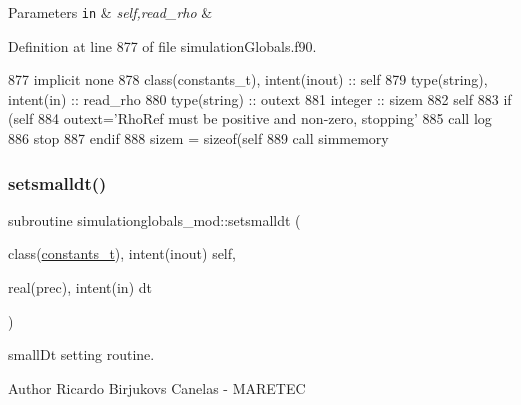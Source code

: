 \begin{DoxyParams}[1]{Parameters}
\mbox{\tt in}  & {\em self,read\+\_\+rho} & \\
\hline
\end{DoxyParams}


Definition at line 877 of file simulation\+Globals.\+f90.


\begin{DoxyCode}
877     \textcolor{keywordtype}{implicit none}
878     \textcolor{keywordtype}{class}(constants\_t), \textcolor{keywordtype}{intent(inout)} :: self
879     \textcolor{keywordtype}{type}(string), \textcolor{keywordtype}{intent(in)} :: read\_rho
880     \textcolor{keywordtype}{type}(string) :: outext
881     \textcolor{keywordtype}{integer} :: sizem
882     self%
883     \textcolor{keywordflow}{if} (self%
884         outext=\textcolor{stringliteral}{'RhoRef must be positive and non-zero, stopping'}
885         \textcolor{keyword}{call }log%
886         stop
887 \textcolor{keywordflow}{    endif}
888     sizem = sizeof(self%
889     \textcolor{keyword}{call }simmemory%
\end{DoxyCode}
\mbox{\label{namespacesimulationglobals__mod_ad36c21a592a3230ce848804075abc97e}} 
\subsubsection{\texorpdfstring{setsmalldt()}{setsmalldt()}}
{\footnotesize\ttfamily subroutine simulationglobals\+\_\+mod\+::setsmalldt (\begin{DoxyParamCaption}\item[{class(\mbox{\hyperlink{structsimulationglobals__mod_1_1constants__t}{constants\+\_\+t}}), intent(inout)}]{self,  }\item[{real(prec), intent(in)}]{dt }\end{DoxyParamCaption})\hspace{0.3cm}{\ttfamily [private]}}



small\+Dt setting routine. 

\begin{DoxyAuthor}{Author}
Ricardo Birjukovs Canelas -\/ M\+A\+R\+E\+T\+EC 
\end{DoxyAuthor}


